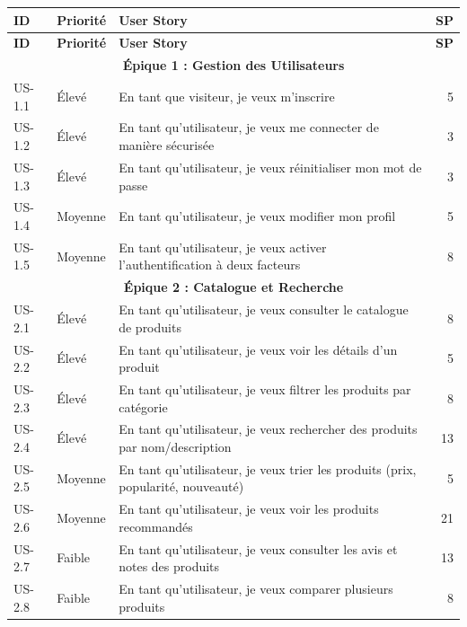 \documentclass[12pt,a4paper]{report}
\begin{document}
\begin{longtable}{|l|l|p{7cm}|r|}
\hline
\textbf{ID} & \textbf{Priorité} & \textbf{User Story} & \textbf{SP} \\ \hline
\endfirsthead

\hline
\textbf{ID} & \textbf{Priorité} & \textbf{User Story} & \textbf{SP} \\ \hline
\endhead

\multicolumn{4}{|c|}{\textbf{Épique 1 : Gestion des Utilisateurs}} \\ \hline
US-1.1 & Élevé & En tant que visiteur, je veux m'inscrire  & 5 \\ \hline
US-1.2 & Élevé & En tant qu'utilisateur, je veux me connecter de manière sécurisée & 3 \\ \hline
US-1.3 & Élevé & En tant qu'utilisateur, je veux réinitialiser mon mot de passe & 3 \\ \hline
US-1.4 & Moyenne & En tant qu'utilisateur, je veux modifier mon profil & 5 \\ \hline
US-1.5 & Moyenne & En tant qu'utilisateur, je veux activer l'authentification à deux facteurs & 8 \\ \hline

\multicolumn{4}{|c|}{\textbf{Épique 2 : Catalogue et Recherche}} \\ \hline
US-2.1 & Élevé & En tant qu'utilisateur, je veux consulter le catalogue de produits & 8 \\ \hline
US-2.2 & Élevé & En tant qu'utilisateur, je veux voir les détails d'un produit & 5 \\ \hline
US-2.3 & Élevé & En tant qu'utilisateur, je veux filtrer les produits par catégorie & 8 \\ \hline
US-2.4 & Élevé & En tant qu'utilisateur, je veux rechercher des produits par nom/description & 13 \\ \hline
US-2.5 & Moyenne & En tant qu'utilisateur, je veux trier les produits (prix, popularité, nouveauté) & 5 \\ \hline
US-2.6 & Moyenne & En tant qu'utilisateur, je veux voir les produits recommandés & 21 \\ \hline
US-2.7 & Faible & En tant qu'utilisateur, je veux consulter les avis et notes des produits & 13 \\ \hline
US-2.8 & Faible & En tant qu'utilisateur, je veux comparer plusieurs produits & 8 \\ \hline


\end{longtable}
\end{document}
